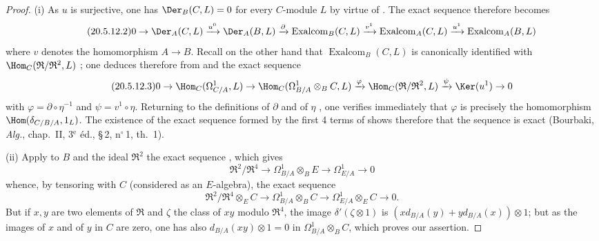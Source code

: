 \begin{proof}
(i) As $u$ is surjective, one has $\Der_B(C,L)=0$ for every $C$-module $L$ by virtue of . The exact sequence  therefore becomes
\begin{equation}
\tag{20.5.12.2}
  \label{0.20.5.12.2}
  0\to\Der_A(C,L)\xrightarrow{u^0}\Der_A(B,L)\xrightarrow{\partial}\operatorname{Exalcom}_B(C,L)
  \xrightarrow{v^1}\operatorname{Exalcom}_A(C,L)\xrightarrow{u^1}\operatorname{Exalcom}_A(B,L)
\end{equation}
where $v$ denotes the homomorphism $A\to B$.
Recall on the other hand that $\operatorname{Exalcom}_B(C,L)$ is canonically identified with $\Hom_C(\mathfrak{R}/\mathfrak{R}^2,L)$ ; one deduces therefore from  and  the exact sequence
\begin{equation}
\tag{20.5.12.3}
  \label{0.20.5.12.3}
  0\to\Hom_C(\Omega^1_{C/A},L)\to\Hom_C(\Omega^1_{B/A}\otimes_B C,L)\xrightarrow{\varphi}\Hom_C(\mathfrak{R}/\mathfrak{R}^2,L)\xrightarrow{\psi}\Ker(u^1)\to 0
\end{equation}
with $\varphi=\partial\circ\eta^{-1}$ and $\psi=v^1\circ\eta$.
Returning to the definitions of $\partial$  and of $\eta$ , one verifies immediately that $\varphi$ is precisely the homomorphism $\Hom(\delta_{C/B/A},1_L)$.
The existence of the exact sequence formed by the first 4 terms of  shows therefore that the sequence  is exact (Bourbaki, \emph{Alg.}, chap.~II, 3$^\text{e}$ \'{e}d., \S\,2, n$^\circ$\,1, th.~1).

\medskip
(ii) Apply to $B$ and the ideal $\mathfrak{R}^2$ the exact sequence , which gives
\begin{equation}
\tag{20.5.12.4}
  \label{0.20.5.12.4}
  \mathfrak{R}^2/\mathfrak{R}^4\to\Omega^1_{B/A}\otimes_B E\to\Omega^1_{E/A}\to 0
\end{equation}
whence, by tensoring with $C$ (considered as an $E$-algebra), the exact sequence
\[
  \mathfrak{R}^2/\mathfrak{R}^4\otimes_E C\to\Omega^1_{B/A}\otimes_B C\to\Omega^1_{E/A}\otimes_E C\to 0.
\]
But if $x,y$ are two elements of $\mathfrak{R}$ and $\zeta$ the class of $xy$ modulo $\mathfrak{R}^4$, the image $\delta'(\zeta\otimes 1)$ is $(xd_{B/A}(y)+yd_{B/A}(x))\otimes 1$; but as the images of $x$ and of $y$ in $C$ are zero, one has also $d_{B/A}(xy)\otimes 1=0$ in $\Omega^1_{B/A}\otimes_B C$, which proves our assertion.


\end{proof}
